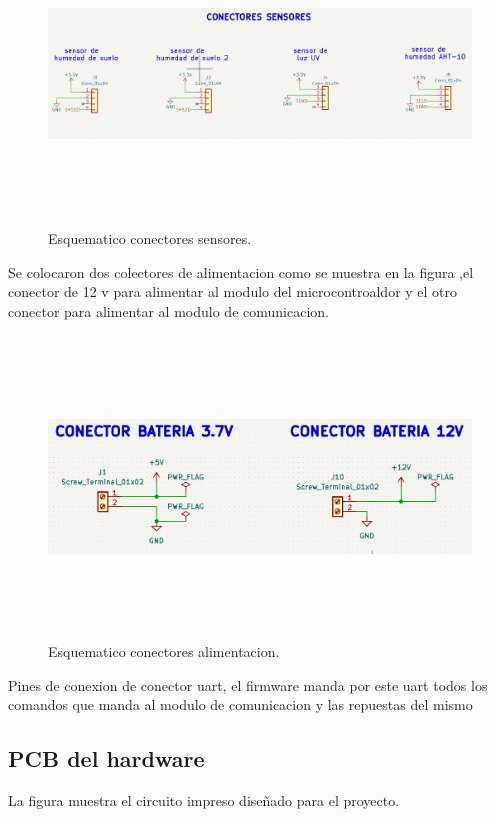\begin{figure}[h]
  \centering
	\includegraphics[width=\textwidth, height=8cm]{./Figures/esquematico_conectores_sensores.png}
	\caption{Esquematico conectores sensores.}
	\label{fig:esquematico conectores sensores}
\end{figure}

Se colocaron dos colectores de alimentacion como se muestra en la figura ,el conector de 12 v para alimentar al modulo del microcontroaldor y el otro conector para alimentar al modulo de comunicacion.
\begin{figure}[h]
  \centering
	\includegraphics[width=\textwidth, height=8cm]{./Figures/esquematico_alimentacion.png}
	\caption{Esquematico conectores alimentacion.}
	\label{fig:esquematico conectores alimentacion}
\end{figure}
Pines de conexion de conector uart, el firmware manda por este uart todos los comandos que manda al modulo de comunicacion y las repuestas del mismo
\clearpage
\subsection{PCB del hardware} 
La figura muestra el circuito impreso diseñado para el proyecto.

